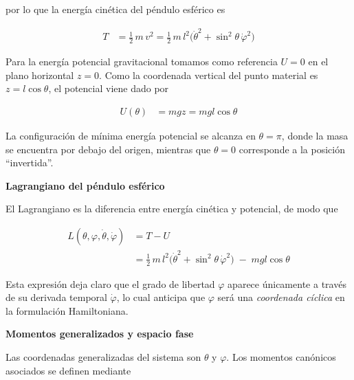 \documentclass{article}
\begin{document}
por lo que la energía cinética del péndulo esférico es

\begin{equation}
\begin{split}
T &= \frac{1}{2}\,m\,v^{2}
   = \frac{1}{2}\,m\,l^{2}\bigl(\dot\theta^{2} + \sin^{2}\theta\,\dot\varphi^{2}\bigr)
\end{split}\label{eq:T-pendulo-esferico}
\end{equation}

Para la energía potencial gravitacional tomamos como referencia \(U=0\) en el plano
horizontal \(z=0\).  
Como la coordenada vertical del punto material es \(z = l\cos\theta\), el potencial
viene dado por

\begin{equation}
\begin{split}
U(\theta) &= m g z = m g l\cos\theta
\end{split}\label{eq:U-pendulo-esferico}
\end{equation}

La configuración de mínima energía potencial se alcanza en \(\theta=\pi\), donde
la masa se encuentra por debajo del origen, mientras que \(\theta=0\) corresponde a
la posición “invertida”.

\vspace{0.5cm}
\textbf{Lagrangiano del péndulo esférico}

El Lagrangiano es la diferencia entre energía cinética y potencial, de modo que

\begin{equation}
\begin{split}
L(\theta,\varphi,\dot\theta,\dot\varphi)
&= T - U \\[4pt]
&= \frac{1}{2}\,m\,l^{2}\bigl(\dot\theta^{2} + \sin^{2}\theta\,\dot\varphi^{2}\bigr)
   \;-\; m g l\cos\theta
\end{split}\label{eq:L-pendulo-esferico}
\end{equation}

Esta expresión deja claro que el grado de libertad \(\varphi\) aparece únicamente a
través de su derivada temporal \(\dot\varphi\), lo cual anticipa que \(\varphi\) será
una \emph{coordenada cíclica} en la formulación Hamiltoniana.

\vspace{0.5cm}
\textbf{Momentos generalizados y espacio fase}

Las coordenadas generalizadas del sistema son \(\theta\) y \(\varphi\).  
Los momentos canónicos asociados se definen mediante
\end{document}
